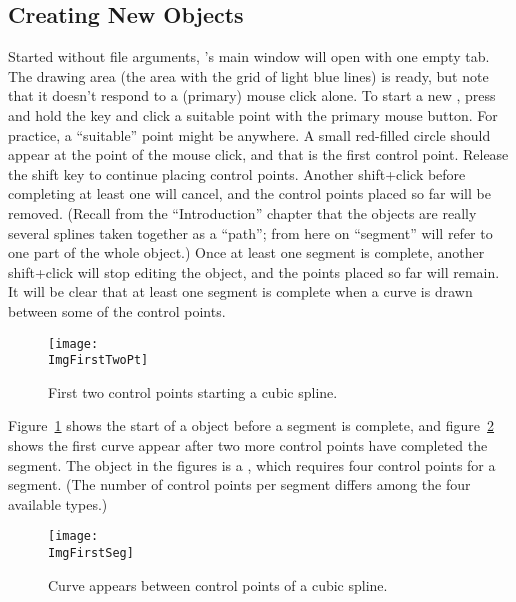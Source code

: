 		\subsection{Creating New Objects}%
		\label{ssec:creating_newobj}
		Started without file arguments, \IXpkg{}'s
		main window will open with one empty tab.
		The drawing area (the area with the grid
		of light blue lines) is ready, but note that it
		doesn't respond to a (primary) mouse click alone. To start
		a new \IXspline{}, press and hold the 
		key and click a suitable point with the primary
		mouse button. For practice, a ``suitable'' point
		might be anywhere. A small red-filled circle should
		appear at the point of the mouse click, and that is
		the first control point. Release the shift key to
		continue placing control points. Another shift+click
		before completing at least one \IXspline{} 
		will cancel, and the control points placed so far will be
		removed. (Recall from the ``Introduction'' chapter
		that the \IXspline{} objects are really several splines
		taken together as a ``path''; from here on ``segment''
		will refer to one \IXspline{} part of the whole \IXspline{} object.)
		Once at least one segment is complete, another
		shift+click will stop editing the object, and the points
		placed so far will remain.
		It will be clear that at least one segment is complete
		when a curve is drawn between some of the control points.
		
		\begin{figure}[htb!]
		\centering
		\texttt{[image: \\ImgFirstTwoPt]}
		\caption{First two control points starting a cubic spline.}
		\label{fig:first_two_points}
		\end{figure}
		
		Figure~\ref{fig:first_two_points} shows the start of a
		\IXspline{} object before a segment is complete, and
		figure~\ref{fig:first_curve_between} shows the first
		curve appear after two more control points have completed
		the segment. The object in the figures is a 
		\IXspline{}, which requires four control points for a segment.
		(The number of control points per segment differs among the
		four available \IXspline{} types.) 
		
		\begin{figure}[htb!]
		\centering
		\texttt{[image: \\ImgFirstSeg]}
		\caption{Curve appears between control points of a cubic spline.}
		\label{fig:first_curve_between}
		\end{figure}

